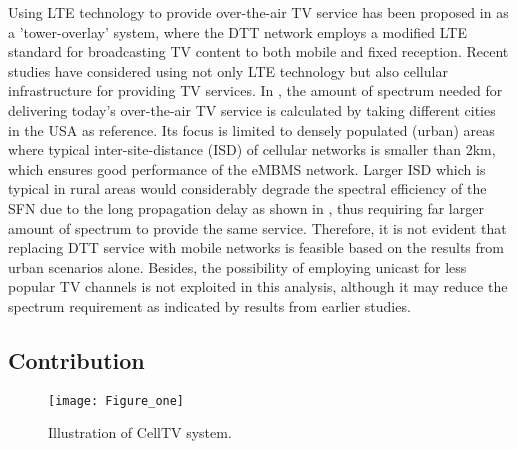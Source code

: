 \documentclass[journal]{IEEEtran}
\begin{document}
Using LTE technology to provide over-the-air TV service has been proposed in \cite{Reimers} as a 'tower-overlay' system, where the DTT network employs a modified LTE standard for broadcasting TV content to both mobile and fixed reception. Recent studies have considered using not only LTE technology but also cellular infrastructure for providing TV services. In \cite{Huschke}, the amount of spectrum needed for delivering today's over-the-air TV service is calculated by taking different cities in the USA as reference. Its focus is limited to densely populated (urban) areas where typical inter-site-distance (ISD) of cellular networks is smaller than 2km, which ensures good performance of the eMBMS network. Larger ISD which is typical in rural areas would considerably degrade the spectral efficiency of the SFN due to the long propagation delay as shown in \cite{Hartung}, thus requiring far larger amount of spectrum to provide the same service. Therefore, it is not evident that replacing DTT service with mobile networks is feasible based on the results from urban scenarios alone. Besides, the possibility of employing unicast for less popular TV channels is not exploited in this analysis, although it may reduce the spectrum requirement as indicated by results from earlier studies.

\subsection{Contribution}

\begin{figure}[t]
  \centering
  \texttt{[image: Figure\_one]}\\
  \caption{Illustration of CellTV system.}\label{fig:CellTV}
\end{figure}
\end{document}
